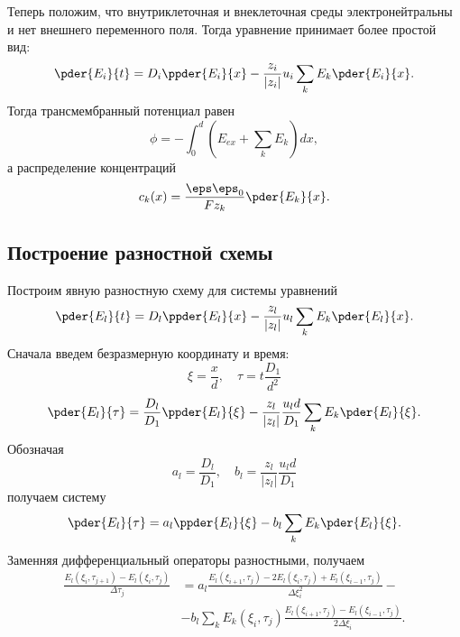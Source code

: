     Теперь положим, что внутриклеточная и внеклеточная среды электронейтральны и
    нет внешнего переменного поля. Тогда уравнение принимает более простой вид:
    \begin{equation}
        \pder{E_i}{t} = D_i\ppder{E_i}{x} -
        \frac{z_i}{|z_i|}u_i \sum_{k} E_k \pder{E_i}{x}.
    \end{equation}
    Тогда трансмембранный потенциал равен
    \begin{equation}
        \phi =  -\int_0^d (E_{ex} + \sum_k E_k) dx,
    \end{equation}
    а распределение концентраций
    \begin{equation}
        c_k(x) = \frac{\eps\eps_0}{Fz_k}\pder{E_k}{x}.
    \end{equation}
\subsection{Построение разностной схемы}
    Построим явную разностную схему для системы уравнений
    \begin{equation}
        \pder{E_l}{t} = D_l\ppder{E_l}{x} -
        \frac{z_l}{|z_l|}u_l \sum_{k} E_k \pder{E_l}{x}.
    \end{equation}
    Сначала введем безразмерную координату и время:
    \begin{equation}
        \xi = \frac{x}{d},\quad \tau = t\frac{D_1}{d^2}
    \end{equation}
    \begin{equation}
        \pder{E_l}{\tau} = \frac{D_l}{D_1}\ppder{E_l}{\xi} -
        \frac{z_l}{|z_l|}\frac{u_ld}{D_1} \sum_{k} E_k \pder{E_l}{\xi}.
    \end{equation}
    Обозначая
    \begin{equation}
        a_l = \frac{D_l}{D_1},\quad b_l = \frac{z_l}{|z_l|}\frac{u_ld}{D_1}
    \end{equation}
    получаем систему
    \begin{equation}
        \pder{E_l}{\tau} = a_l\ppder{E_l}{\xi} - b_l\sum_k E_k \pder{E_l}{\xi}.
    \end{equation}
    Заменняя дифференциальный операторы разностными, получаем
    \begin{align*}
        \frac{E_l(\xi_i, \tau_{j+1}) - E_l(\xi_i, \tau_j)}{\Delta\tau_j} & =
        a_l\frac{E_l(\xi_{i+1}, \tau_j) - 2E_l(\xi_i, \tau_j) +
        E_l(\xi_{i-1}, \tau_j)}{\Delta\xi_i^2} -\\
        & -b_l\sum_k E_k(\xi_i, \tau_j)
        \frac{E_l(\xi_{i+1}, \tau_j) - E_l(\xi_{i-1}, \tau_j)}{2\Delta\xi_i}.
    \end{align*}
